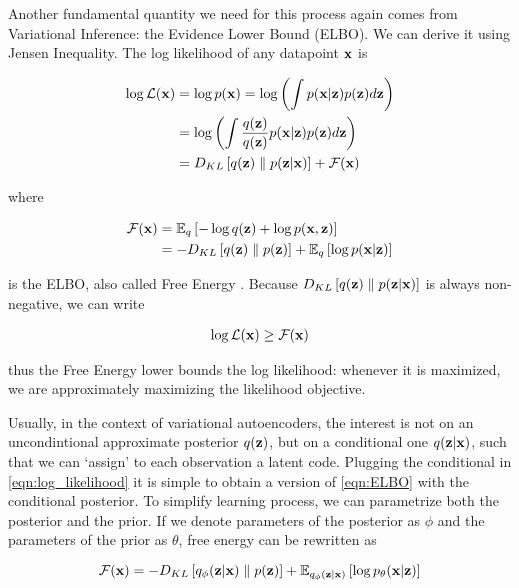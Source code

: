 \documentclass[12pt]{article}
\begin{document}
Another fundamental quantity we need for this process again comes from Variational Inference: the Evidence Lower Bound (ELBO). We can derive it using Jensen Inequality. The log likelihood of any datapoint \(\textbf{x}\) is 

\begin{align}
    \label{eqn:log_likelihood}
    \log \mathcal{L}(\textbf{x}) &= \log p(\textbf{x}) = \log \left( \int p(\textbf{x}|\textbf{z})p(\textbf{z})d\textbf{z} \right) \nonumber \\
    &= \log \left( \int \frac{q (\textbf{z})}{q (\textbf{z})} p(\textbf{x}|\textbf{z})p(\textbf{z})d\textbf{z} \right) \nonumber \\
    &= D_{KL}\left[ q (\textbf{z}) \parallel p(\textbf{z}|\textbf{x}) \right] + \mathcal{F}(\textbf{x}) 
\end{align}

where

\begin{align}
    \label{eqn:ELBO}
    \mathcal{F}(\textbf{x}) &= \mathbb{E}_{q } \left[ -\log q (\textbf{z}) + \log p(\textbf{x},\textbf{z})\right] \nonumber \\
    &= -D_{KL}\left[ q (\textbf{z}) \parallel p(\textbf{z}) \right] + \mathbb{E}_{q } \left[ \log p(\textbf{x}|\textbf{z})\right]
\end{align}

is the ELBO, also called Free Energy \cite{pmlr-v32-rezende14}.
Because \(D_{KL}\left[ q(\textbf{z}) \parallel p(\textbf{z}|\textbf{x}) \right]\) is always non-negative, we can write

\begin{align}
    \log \mathcal{L}(\textbf{x}) \geq \mathcal{F}(\textbf{x})
\end{align}

thus the Free Energy lower bounds the log likelihood: whenever it is maximized, we are approximately maximizing the likelihood objective.


Usually, in the context of variational autoencoders, the interest is not on an uncondintional approximate posterior \(q(\textbf{z})\), but on a conditional one \(q(\textbf{z}|\textbf{x})\), such that we can `assign' to each observation a latent code. Plugging the conditional in \eqref{eqn:log_likelihood} it is simple to obtain a version of \eqref{eqn:ELBO} with the conditional posterior. To simplify learning process, we can parametrize both the posterior and the prior. If we denote parameters of the posterior as \(\phi\) and the parameters of the prior as \(\theta\), free energy can be rewritten as

\begin{equation}
    \label{eqn:ELBO}
    \mathcal{F}(\textbf{x}) = -D_{KL}\left[ q_{\phi}(\textbf{z}|\textbf{x}) \parallel p(\textbf{z}) \right] + \mathbb{E}_{q_{\phi}(\textbf{z}|\textbf{x})} \left[ \log p_{\theta}(\textbf{x}|\textbf{z}) \right]
\end{equation}
\end{document}
